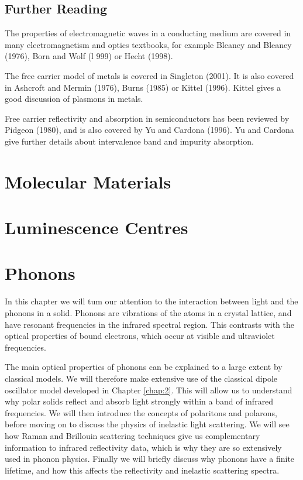 \documentclass[12pt]{book}
\begin{document}
{\section*{Further Reading}
The properties of electromagnetic waves in a conducting medium are covered in many electromagnetism and optics textbooks, for example Bleaney and Bleaney (1976), Born and Wolf (l 999) or Hecht (1998).

The free carrier model of metals is covered in Singleton (2001). It is also covered in Ashcroft and Mermin (1976), Burns (1985) or Kittel (1996). Kittel gives a good discussion of plasmons in metals.

Free carrier reflectivity and absorption in semiconductors has been reviewed by Pidgeon (1980), and is also covered by Yu and Cardona (1996). Yu and Cardona give further details about intervalence band and impurity absorption.
\chapter{Molecular Materials}\label{chap:8}
\chapter{Luminescence Centres}\label{chap:9}
\chapter{Phonons}\label{chap:10}
\begin{shaded}
In this chapter we will tum our attention to the interaction between light and the phonons in a solid. Phonons are vibrations of the atoms in a crystal lattice, and have resonant frequencies in the infrared spectral region. This contrasts with the optical properties of bound electrons, which occur at visible and ultraviolet frequencies.

The main optical properties of phonons can be explained to a large extent by classical models. We will therefore make extensive use of the classical dipole oscillator model developed in Chapter \ref{chap:2}. This will allow us to understand why polar solids reflect and absorb light strongly within a band of infrared frequencies. We will then introduce the concepts of polaritons and polarons, before moving on to discuss the physics of inelastic light scattering. We will see how Raman and Brillouin scattering techniques give us complementary information to infrared reflectivity data, which is why they are so extensively used in phonon physics. Finally we will briefly discuss why phonons have a finite lifetime, and how this affects the reflectivity and inelastic scattering spectra.


\end{shaded}}
\end{document}
